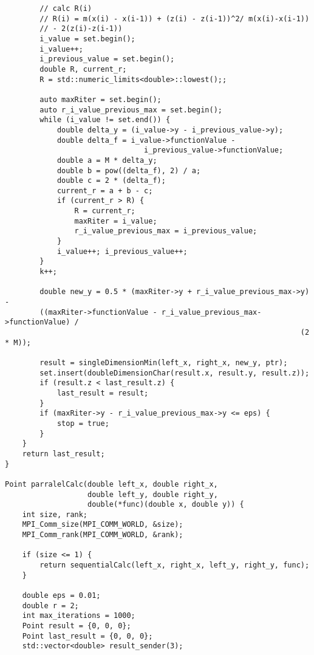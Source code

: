 \documentclass{report}
\begin{document}
\begin{lstlisting}
        // calc R(i)
        // R(i) = m(x(i) - x(i-1)) + (z(i) - z(i-1))^2/ m(x(i)-x(i-1))
        // - 2(z(i)-z(i-1))
        i_value = set.begin();
        i_value++;
        i_previous_value = set.begin();
        double R, current_r;
        R = std::numeric_limits<double>::lowest();;

        auto maxRiter = set.begin();
        auto r_i_value_previous_max = set.begin();
        while (i_value != set.end()) {
            double delta_y = (i_value->y - i_previous_value->y);
            double delta_f = i_value->functionValue -
                                i_previous_value->functionValue;
            double a = M * delta_y;
            double b = pow((delta_f), 2) / a;
            double c = 2 * (delta_f);
            current_r = a + b - c;
            if (current_r > R) {
                R = current_r;
                maxRiter = i_value;
                r_i_value_previous_max = i_previous_value;
            }
            i_value++; i_previous_value++;
        }
        k++;

        double new_y = 0.5 * (maxRiter->y + r_i_value_previous_max->y) -
        ((maxRiter->functionValue - r_i_value_previous_max->functionValue) /
                                                                    (2 * M));

        result = singleDimensionMin(left_x, right_x, new_y, ptr);
        set.insert(doubleDimensionChar(result.x, result.y, result.z));
        if (result.z < last_result.z) {
            last_result = result;
        }
        if (maxRiter->y - r_i_value_previous_max->y <= eps) {
            stop = true;
        }
    }
    return last_result;
}

Point parralelCalc(double left_x, double right_x,
                   double left_y, double right_y,
                   double(*func)(double x, double y)) {
    int size, rank;
    MPI_Comm_size(MPI_COMM_WORLD, &size);
    MPI_Comm_rank(MPI_COMM_WORLD, &rank);

    if (size <= 1) {
        return sequentialCalc(left_x, right_x, left_y, right_y, func);
    }

    double eps = 0.01;
    double r = 2;
    int max_iterations = 1000;
    Point result = {0, 0, 0};
    Point last_result = {0, 0, 0};
    std::vector<double> result_sender(3);


\end{lstlisting}
\end{document}
